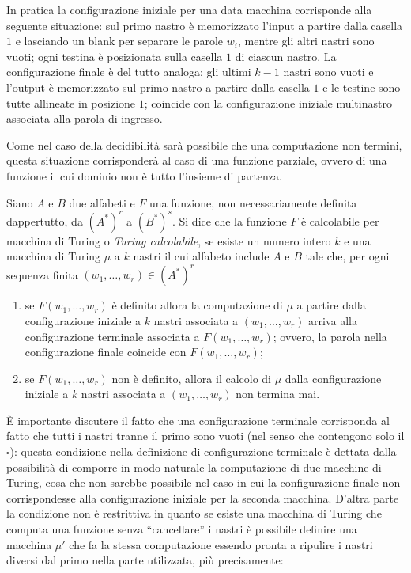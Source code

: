 In pratica la configurazione iniziale per una data macchina corrisponde alla seguente situazione: sul primo nastro è memorizzato l'input a partire dalla casella $1$ e lasciando un blank per separare le parole $w_i$, mentre gli altri nastri sono vuoti; ogni testina è posizionata sulla casella $1$ di ciascun nastro. La configurazione finale è del tutto analoga: gli ultimi $k-1$ nastri sono vuoti e l'output è memorizzato sul primo nastro a partire dalla casella $1$ e le testine sono tutte allineate in posizione $1$; coincide con la configurazione iniziale multinastro associata alla parola di ingresso.

Come nel caso della decidibilità sarà possibile che una computazione non termini, questa situazione corrisponderà al caso di una funzione parziale, ovvero di una funzione il cui dominio non è tutto l'insieme di partenza.

\begin{defi}
Siano $A$ e $B$ due alfabeti e $F$ una funzione, non necessariamente definita dappertutto, da $(A^*)^r$ a $(B^*)^s$. Si dice che la funzione $F$ è calcolabile per macchina di Turing o \emph{Turing calcolabile}, se esiste un numero intero $k$ e una macchina di Turing $\mu$ a $k$ nastri il cui alfabeto include $A$ e $B$ tale che, per ogni sequenza finita $(w_1,\dots,w_r)\in(A^*)^r$
\begin{enumerate}
    \item[i)] se $F(w_1,\dots,w_r)$ è definito allora la computazione di $\mu$ a partire dalla configurazione iniziale a $k$ nastri associata a $(w_1,\dots,w_r)$ arriva alla configurazione terminale associata a $F(w_1,\dots,w_r)$; ovvero, la parola nella configurazione finale coincide con $F(w_1,\dots,w_r)$;
    \item[ii)] se $F(w_1,\dots,w_r)$ non è definito, allora il calcolo di $\mu$ dalla configurazione iniziale a $k$ nastri associata a $(w_1,\dots,w_r)$ non termina mai.
\end{enumerate}
\end{defi}

È importante discutere il fatto che una configurazione terminale corrisponda al fatto che tutti i nastri tranne il primo sono vuoti (nel senso che contengono solo il $\square$): questa condizione nella definizione di configurazione terminale è dettata dalla possibilità di comporre in modo naturale la computazione di due macchine di Turing, cosa che non sarebbe possibile nel caso in cui la configurazione finale non corrispondesse alla configurazione iniziale per la seconda macchina. D'altra parte la condizione non è restrittiva in quanto se esiste una macchina di Turing che computa una funzione senza ``cancellare'' i nastri è possibile definire una macchina $\mu'$ che fa la stessa computazione essendo pronta a ripulire i nastri diversi dal primo nella parte utilizzata, più precisamente:

